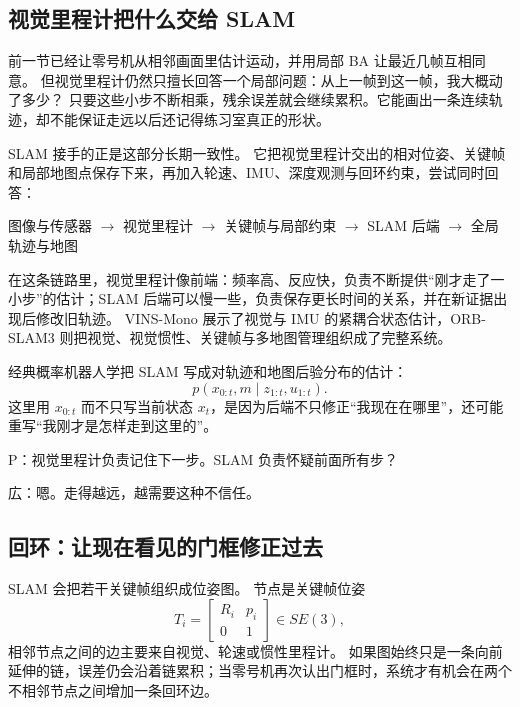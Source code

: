 \subsection{视觉里程计把什么交给 SLAM}

前一节已经让零号机从相邻画面里估计运动，并用局部 BA 让最近几帧互相同意。
但视觉里程计仍然只擅长回答一个局部问题：从上一帧到这一帧，我大概动了多少？
只要这些小步不断相乘，残余误差就会继续累积。它能画出一条连续轨迹，却不能保证走远以后还记得练习室真正的形状。

SLAM 接手的正是这部分长期一致性。
它把视觉里程计交出的相对位姿、关键帧和局部地图点保存下来，再加入轮速、IMU、深度观测与回环约束，尝试同时回答：

\begin{center}
图像与传感器
$\rightarrow$ 视觉里程计
$\rightarrow$ 关键帧与局部约束
$\rightarrow$ SLAM 后端
$\rightarrow$ 全局轨迹与地图
\end{center}

在这条链路里，视觉里程计像前端：频率高、反应快，负责不断提供“刚才走了一小步”的估计；SLAM 后端可以慢一些，负责保存更长时间的关系，并在新证据出现后修改旧轨迹。
VINS-Mono 展示了视觉与 IMU 的紧耦合状态估计\cite{qin2018vinsmono}，ORB-SLAM3 则把视觉、视觉惯性、关键帧与多地图管理组织成了完整系统\cite{campos2021orbslam3}。

经典概率机器人学把 SLAM 写成对轨迹和地图后验分布的估计\cite{thrun2005prob}：
\begin{equation}
p(x_{0:t},m\mid z_{1:t},u_{1:t}).
\end{equation}
这里用 $x_{0:t}$ 而不只写当前状态 $x_t$，是因为后端不只修正“我现在在哪里”，还可能重写“我刚才是怎样走到这里的”。

P：视觉里程计负责记住下一步。SLAM 负责怀疑前面所有步？

広：嗯。走得越远，越需要这种不信任。

\subsection{回环：让现在看见的门框修正过去}

SLAM 会把若干关键帧组织成位姿图。
节点是关键帧位姿
\begin{equation}
T_i=
\left[
\begin{array}{cc}
R_i & p_i\\
0 & 1
\end{array}
\right]\in SE(3),
\end{equation}
相邻节点之间的边主要来自视觉、轮速或惯性里程计。
如果图始终只是一条向前延伸的链，误差仍会沿着链累积；当零号机再次认出门框时，系统才有机会在两个不相邻节点之间增加一条回环边。

